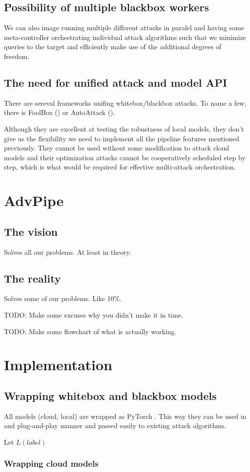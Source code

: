 \subsection{Possibility of multiple blackbox workers}
We can also image running multiple different attacks in paralel and having some meta-controller orchestrating individual attack algorithms such that we minimize queries to the target and efficiently make use of the additional degrees of freedom.


\subsection{The need for unified attack and model API}
There are sereval frameworks unifing whitebox/blackbox attacks. To name a few, there is 
FoolBox (\cite{Rauber2020FoolboxNF}) or AutoAttack (\cite{croce2020reliable}). 

Although they are excellent at testing the robustness of local models, they don't give us the flexibility we need to implement all the pipeline features mentioned previously. They cannot be used without some modification to attack cloud models and their optimization attacks cannot be cooperatively scheduled step by step, which is what would be required for effective multi-attack orchestration.

\section{AdvPipe}

\subsection{The vision}
Solves all our problems. At least in theory.

\subsection{The reality}
Solves some of our problems. Like 10\%.

TODO: Make some excuses why you didn't make it in time.

TODO: Make some flowchart of what is actually working.


\section{Implementation}




\subsection{Wrapping whitebox and blackbox models}
All models (cloud, local) are wrapped as PyTorch . This way they can be used in and plug-and-play manner and passed easily to existing attack algorithms.

Let $L(label)$

\subsubsection{Wrapping cloud models}

